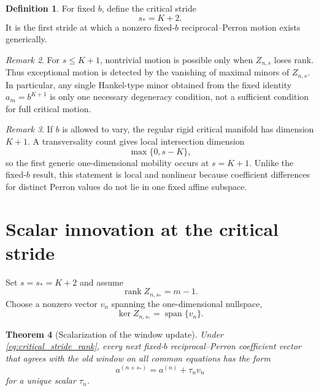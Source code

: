 \documentclass[11pt]{amsart}
\numberwithin{equation}{section}
\theoremstyle{plain}
\newtheorem{theorem}{Theorem}[section]
\theoremstyle{definition}
\newtheorem{definition}[theorem]{Definition}
\theoremstyle{remark}
\newtheorem{remark}[theorem]{Remark}
\begin{document}
\begin{definition}
\label{def:critical_stride}
For fixed $b$, define the critical stride
\begin{equation}
s_*=K+2.
\label{eq:critical_stride}
\end{equation}
It is the first stride at which a nonzero fixed-$b$ reciprocal--Perron motion exists generically.
\end{definition}

\begin{remark}
\label{rem:small_stride_degeneracy}
For $s\leq K+1$, nontrivial motion is possible only when $Z_{n,s}$ loses rank.  Thus exceptional motion is detected by the vanishing of maximal minors of $Z_{n,s}$.  In particular, any single Hankel-type minor obtained from the fixed identity $a_m=b^{K+1}$ is only one necessary degeneracy condition, not a sufficient condition for full critical motion.
\end{remark}

\begin{remark}
\label{rem:moving_b_threshold}
If $b$ is allowed to vary, the regular rigid critical manifold has dimension $K+1$.  A transversality count gives local intersection dimension
\begin{equation}
\max\{0,s-K\},
\label{eq:moving_b_local_dimension}
\end{equation}
so the first generic one-dimensional mobility occurs at $s=K+1$.  Unlike the fixed-$b$ result, this statement is local and nonlinear because coefficient differences for distinct Perron values do not lie in one fixed affine subspace.
\end{remark}

\section{Scalar innovation at the critical stride}
\label{sec:scalar_innovation}

Set $s=s_*=K+2$ and assume
\begin{equation}
\operatorname{rank}Z_{n,s_*}=m-1.
\label{eq:critical_stride_rank}
\end{equation}
Choose a nonzero vector $v_n$ spanning the one-dimensional nullspace,
\begin{equation}
\ker Z_{n,s_*}=\operatorname{span}\{v_n\}.
\label{eq:critical_stride_direction}
\end{equation}

\begin{theorem}[Scalarization of the window update]
\label{thm:scalarization}
Under \eqref{eq:critical_stride_rank}, every next fixed-$b$ reciprocal--Perron coefficient vector that agrees with the old window on all common equations has the form
\begin{equation}
a^{(n+s_*)}=a^{(n)}+\tau_n v_n
\label{eq:scalar_coefficient_update}
\end{equation}
for a unique scalar $\tau_n$.
\end{theorem}
\end{document}
